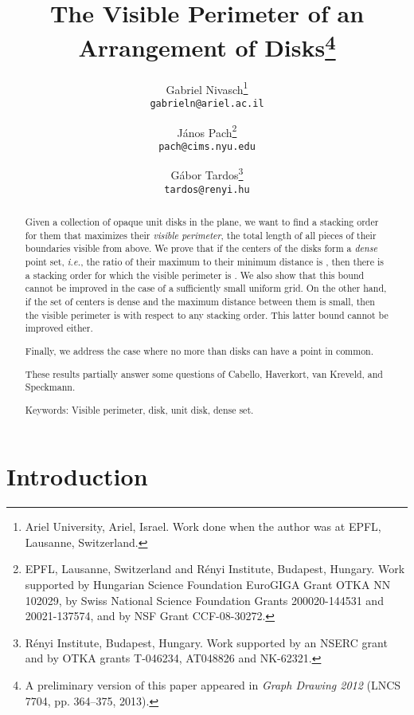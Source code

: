 \documentclass[11pt]{article}
\begin{document}
\title{The Visible Perimeter of an Arrangement of Disks\footnote{A preliminary version of this paper appeared in \emph{Graph Drawing 2012} (LNCS 7704, pp. 364--375, 2013).}}

\author{Gabriel Nivasch\footnote{Ariel University, Ariel, Israel. Work done when the author was at EPFL, Lausanne, Switzerland.}\\\texttt{gabrieln@ariel.ac.il} \and J\'anos Pach\footnote{EPFL, Lausanne, Switzerland and R\'enyi Institute, Budapest, Hungary. Work supported by Hungarian Science Foundation EuroGIGA Grant OTKA NN 102029, by Swiss National Science Foundation Grants 200020-144531 and 20021-137574, and by NSF Grant CCF-08-30272.}\\\texttt{pach@cims.nyu.edu}  \and G\'abor Tardos\footnote{R\'enyi Institute, Budapest, Hungary. Work supported by an NSERC grant and by OTKA grants T-046234, AT048826 and NK-62321.}\\\texttt{tardos@renyi.hu}}

\maketitle


\begin{abstract}
Given a collection of  opaque unit disks in the plane, we want to find a stacking order for them that maximizes their {\em visible perimeter}, the total length of
all pieces of their boundaries visible from above.  We prove that if the centers of the disks form a {\em dense} point set,
{\em i.e.}, the ratio of their maximum to their minimum distance
is , then there is a stacking order for which the visible
perimeter is . We also show that
this bound cannot be improved in the case of a sufficiently small  uniform grid. On the other hand, if the
set of centers is dense and the maximum distance between them is
small, then the visible perimeter is  with respect to any stacking order. This latter bound cannot be improved either.

Finally, we address the case where no more than  disks can have a point in common.

These results partially answer some questions of Cabello, Haverkort, van Kreveld, and Speckmann.

Keywords: Visible perimeter, disk, unit disk, dense set.
\end{abstract}


\section{Introduction}
\end{document}

